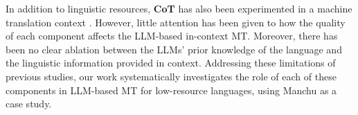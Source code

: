 In addition to linguistic resources, \textbf{CoT}  has also been experimented in a machine translation context \citep{elsner-needle-2023-translating}. 
However, little attention has been given to how the quality of each component affects the LLM-based in-context MT. Moreover, there has been no clear ablation between the LLMs' prior knowledge of the language and the linguistic information provided in context.
Addressing these limitations of previous studies, our work systematically investigates the role of each of these components in LLM-based MT for low-resource languages, using Manchu as a case study.


